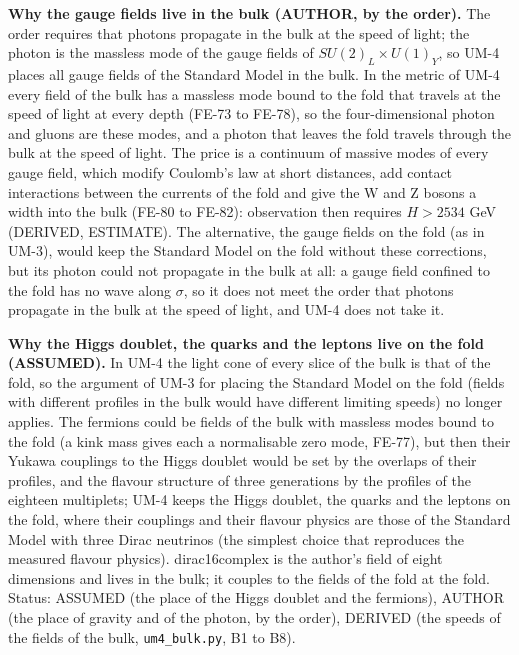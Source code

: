 \documentclass[
  10pt,
]{article}
\begin{document}
\textbf{Why the gauge fields live in the bulk (AUTHOR, by the order).}
The order requires that photons propagate in the bulk at the speed of
light; the photon is the massless mode of the gauge fields of
\(SU(2)_L \times U(1)_Y\), so UM-4 places all gauge fields of the
Standard Model in the bulk. In the metric of UM-4 every field of the
bulk has a massless mode bound to the fold that travels at the speed of
light at every depth (FE-73 to FE-78), so the four-dimensional photon
and gluons are these modes, and a photon that leaves the fold travels
through the bulk at the speed of light. The price is a continuum of
massive modes of every gauge field, which modify Coulomb's law at short
distances, add contact interactions between the currents of the fold and
give the W and Z bosons a width into the bulk (FE-80 to FE-82):
observation then requires \(H > 2534\) GeV (DERIVED, ESTIMATE). The
alternative, the gauge fields on the fold (as in UM-3), would keep the
Standard Model on the fold without these corrections, but its photon
could not propagate in the bulk at all: a gauge field confined to the
fold has no wave along \(\sigma\), so it does not meet the order that
photons propagate in the bulk at the speed of light, and UM-4 does not
take it.

\textbf{Why the Higgs doublet, the quarks and the leptons live on the
fold (ASSUMED).} In UM-4 the light cone of every slice of the bulk is
that of the fold, so the argument of UM-3 for placing the Standard Model
on the fold (fields with different profiles in the bulk would have
different limiting speeds) no longer applies. The fermions could be
fields of the bulk with massless modes bound to the fold (a kink mass
gives each a normalisable zero mode, FE-77), but then their Yukawa
couplings to the Higgs doublet would be set by the overlaps of their
profiles, and the flavour structure of three generations by the profiles
of the eighteen multiplets; UM-4 keeps the Higgs doublet, the quarks and
the leptons on the fold, where their couplings and their flavour physics
are those of the Standard Model with three Dirac neutrinos (the simplest
choice that reproduces the measured flavour physics). dirac16complex is
the author's field of eight dimensions and lives in the bulk; it couples
to the fields of the fold at the fold. Status: ASSUMED (the place of the
Higgs doublet and the fermions), AUTHOR (the place of gravity and of the
photon, by the order), DERIVED (the speeds of the fields of the bulk,
\texttt{um4\_bulk.py}, B1 to B8).
\end{document}
